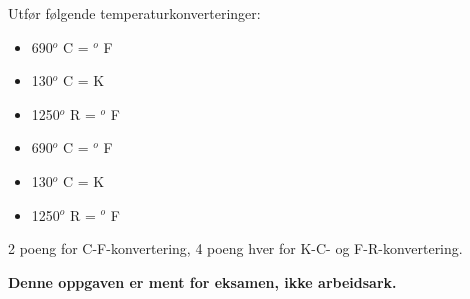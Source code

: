 

Utfør følgende temperaturkonverteringer:

\begin{itemize}
\item{} 690$^{o}$ C = \underbar{\hskip 50pt} $^{o}$ F
\vskip 5pt
\item{} 130$^{o}$ C = \underbar{\hskip 50pt} K
\vskip 5pt
\item{} 1250$^{o}$ R = \underbar{\hskip 50pt} $^{o}$ F
\end{itemize}







\begin{itemize}
\item{} 690$^{o}$ C =  $^{o}$ F
\vskip 5pt
\item{} 130$^{o}$ C =  K
\vskip 5pt
\item{} 1250$^{o}$ R =  $^{o}$ F
\end{itemize}

2 poeng for C-F-konvertering, 4 poeng hver for K-C- og F-R-konvertering.







{\bf Denne oppgaven er ment for eksamen, ikke arbeidsark.}

